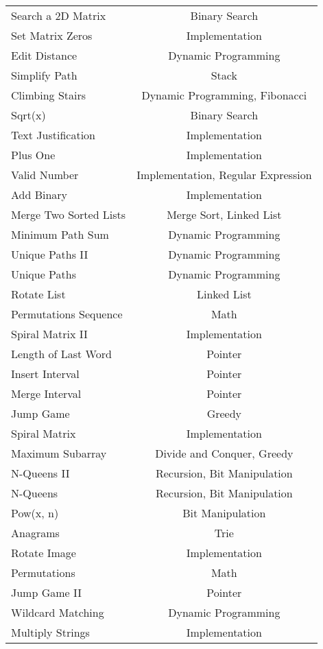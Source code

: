 \documentclass[paper=a4, fontsize=11pt]{scrartcl} %
\begin{document}
\begin{center}
\begin{longtable}{|l|c|}
    Search a 2D Matrix  &   Binary Search   \\
    Set Matrix Zeros    &   Implementation  \\
    Edit Distance   &   Dynamic Programming \\
    Simplify Path   &   Stack   \\
    Climbing Stairs &   Dynamic Programming, Fibonacci  \\
    Sqrt(x) &   Binary Search   \\
    Text Justification  &   Implementation  \\
    Plus One    &   Implementation  \\
    Valid Number    &   Implementation, Regular Expression   \\
    Add Binary  &   Implementation  \\
    Merge Two Sorted Lists  &   Merge Sort, Linked List \\
    Minimum Path Sum  & Dynamic Programming \\
    Unique Paths II & Dynamic Programming  \\
    Unique Paths & Dynamic Programming  \\
    Rotate List & Linked List \\
    Permutations Sequence & Math  \\
    Spiral Matrix II  & Implementation  \\
    Length of Last Word & Pointer \\
    Insert Interval & Pointer \\
    Merge Interval  & Pointer \\
    Jump Game & Greedy  \\
    Spiral Matrix & Implementation  \\
    Maximum Subarray    &   Divide and Conquer, Greedy  \\
    N-Queens II    &   Recursion, Bit Manipulation \\
    N-Queens    &   Recursion, Bit Manipulation \\
    Pow(x, n)   &   Bit Manipulation    \\
    Anagrams    &   Trie    \\
    Rotate Image    &   Implementation  \\
    Permutations    &   Math    \\
    Jump Game II    &   Pointer\\
    Wildcard Matching   &   Dynamic Programming \\
    Multiply Strings    &   Implementation  \\

\end{longtable}
\end{center}
\end{document}
